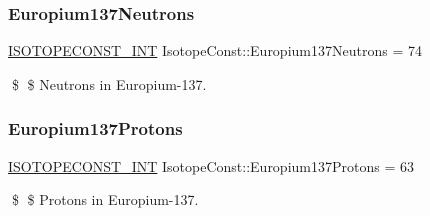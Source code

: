 \subsubsection{\texorpdfstring{Europium137\+Neutrons}{Europium137Neutrons}}
{\footnotesize\ttfamily \mbox{\hyperlink{group___isotope_const-_macros_ga5f18360b3e99483a35c32d789e62621c}{I\+S\+O\+T\+O\+P\+E\+C\+O\+N\+S\+T\+\_\+\+I\+NT}} Isotope\+Const\+::\+Europium137\+Neutrons = 74}

\$ \$ Neutrons in Europium-\/137. \mbox{\label{group___isotope_const-_europium-_eu137_gaedb7fe45412288f79dfe4a004ee0554c}} 
\subsubsection{\texorpdfstring{Europium137\+Protons}{Europium137Protons}}
{\footnotesize\ttfamily \mbox{\hyperlink{group___isotope_const-_macros_ga5f18360b3e99483a35c32d789e62621c}{I\+S\+O\+T\+O\+P\+E\+C\+O\+N\+S\+T\+\_\+\+I\+NT}} Isotope\+Const\+::\+Europium137\+Protons = 63}

\$ \$ Protons in Europium-\/137. 